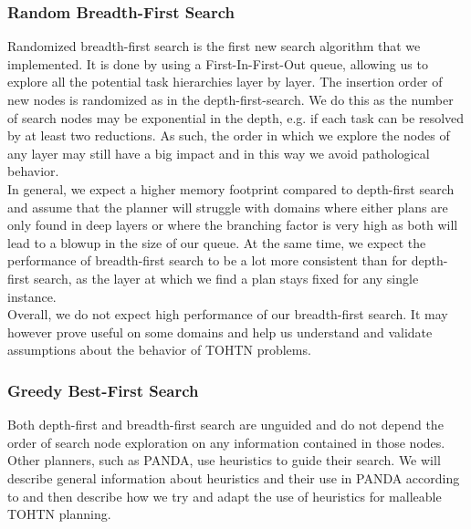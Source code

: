 \subsubsection{Random Breadth-First Search}
Randomized breadth-first search is the first new search algorithm that we implemented. It is done by using a First-In-First-Out queue, allowing us to explore all the potential task hierarchies layer by layer. The insertion order of new nodes is randomized as in the depth-first-search. We do this as the number of search nodes may be exponential in the depth, e.g. if each task can be resolved by at least two reductions.  As such, the order in which we explore the nodes of any layer may still have a big impact and in this way we avoid pathological behavior. \\
In general, we expect a higher memory footprint compared to depth-first search and assume that the planner will struggle with domains where either plans are only found in deep layers or where the branching factor is very high as both will lead to a blowup in the size of our queue. At the same time, we expect the performance of breadth-first search to be a lot more consistent than for depth-first search, as the layer at which we find a plan stays fixed for any single instance. \\
Overall, we do not expect high performance of our breadth-first search. It may however prove useful on some domains and help us understand and validate assumptions about the behavior of TOHTN problems.
\begin{comment}
- expect more memory
- worse performance
- will struggle with high branching factor or deep plans

- trivially complete, will always encounter everything
- reference statistics (branching factor from Crowd, minimal plan depth from Lilotane) to show that 

- probably not the best performance
- will help validate assumptions about TOHTN characteristics
\end{comment}

\subsubsection{Greedy Best-First Search}
Both depth-first and breadth-first search are unguided and do not depend the order of search node exploration on any information contained in those nodes. Other planners, such as PANDA, use heuristics to guide their search. We will describe general information about heuristics and their use in PANDA according to \cite{holler2020htn} and then describe how we try and adapt the use of heuristics for malleable TOHTN planning.

